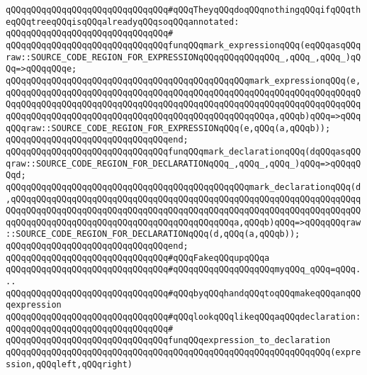 \verb|qQQqqQQqqQQqqQQqqQQqqQQqqQQqqQQq#qQQqTheyqQQqdoqQQqnothingqQQqifqQQqtheqQQqtreeqQQqisqQQqalreadyqQQqsoqQQqannotated:|\newline
\verb|qQQqqQQqqQQqqQQqqQQqqQQqqQQqqQQq#|\newline
\verb|qQQqqQQqqQQqqQQqqQQqqQQqqQQqqQQqfunqQQqmark_expressionqQQq(eqQQqasqQQqraw::SOURCE_CODE_REGION_FOR_EXPRESSIONqQQqqQQqqQQqqQQq_,qQQq_,qQQq_)qQQq=>qQQqqQQqe;|\newline
\verb|qQQqqQQqqQQqqQQqqQQqqQQqqQQqqQQqqQQqqQQqqQQqqQQqmark_expressionqQQq(e,qQQqqQQqqQQqqQQqqQQqqQQqqQQqqQQqqQQqqQQqqQQqqQQqqQQqqQQqqQQqqQQqqQQqqQQqqQQqqQQqqQQqqQQqqQQqqQQqqQQqqQQqqQQqqQQqqQQqqQQqqQQqqQQqqQQqqQQqqQQqqQQqqQQqqQQqqQQqqQQqqQQqqQQqqQQqqQQqqQQqqQQqqQQqqQQqa,qQQqb)qQQq=>qQQqqQQqraw::SOURCE_CODE_REGION_FOR_EXPRESSIONqQQq(e,qQQq(a,qQQqb));|\newline
\verb|qQQqqQQqqQQqqQQqqQQqqQQqqQQqqQQqend;|\newline
\newline
\verb|qQQqqQQqqQQqqQQqqQQqqQQqqQQqqQQqfunqQQqmark_declarationqQQq(dqQQqasqQQqraw::SOURCE_CODE_REGION_FOR_DECLARATIONqQQq_,qQQq_,qQQq_)qQQq=>qQQqqQQqd;|\newline
\verb|qQQqqQQqqQQqqQQqqQQqqQQqqQQqqQQqqQQqqQQqqQQqqQQqmark_declarationqQQq(d,qQQqqQQqqQQqqQQqqQQqqQQqqQQqqQQqqQQqqQQqqQQqqQQqqQQqqQQqqQQqqQQqqQQqqQQqqQQqqQQqqQQqqQQqqQQqqQQqqQQqqQQqqQQqqQQqqQQqqQQqqQQqqQQqqQQqqQQqqQQqqQQqqQQqqQQqqQQqqQQqqQQqqQQqqQQqqQQqqQQqqQQqa,qQQqb)qQQq=>qQQqqQQqraw::SOURCE_CODE_REGION_FOR_DECLARATIONqQQq(d,qQQq(a,qQQqb));|\newline
\verb|qQQqqQQqqQQqqQQqqQQqqQQqqQQqqQQqend;|\newline
\newline
\newline
\verb|qQQqqQQqqQQqqQQqqQQqqQQqqQQqqQQq#qQQqFakeqQQqupqQQqa|\newline
\verb|qQQqqQQqqQQqqQQqqQQqqQQqqQQqqQQq#qQQqqQQqqQQqqQQqqQQqmyqQQq_qQQq=qQQq...|\newline
\verb|qQQqqQQqqQQqqQQqqQQqqQQqqQQqqQQq#qQQqbyqQQqhandqQQqtoqQQqmakeqQQqanqQQqexpression|\newline
\verb|qQQqqQQqqQQqqQQqqQQqqQQqqQQqqQQq#qQQqlookqQQqlikeqQQqaqQQqdeclaration:|\newline
\verb|qQQqqQQqqQQqqQQqqQQqqQQqqQQqqQQq#|\newline
\verb|qQQqqQQqqQQqqQQqqQQqqQQqqQQqqQQqfunqQQqexpression_to_declaration|\newline
\verb|qQQqqQQqqQQqqQQqqQQqqQQqqQQqqQQqqQQqqQQqqQQqqQQqqQQqqQQqqQQqqQQq(expression,qQQqleft,qQQqright)|\newline
